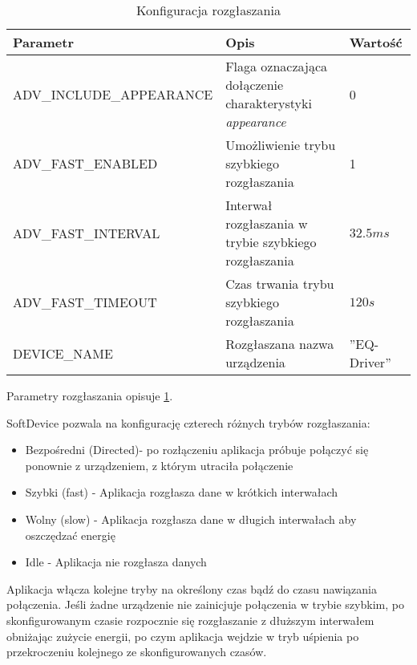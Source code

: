 \begin{table}[t]

\begin{tabularx}{\linewidth}{|l|X|l|}

\hline Parametr & Opis & Wartość \\

\hline ADV\_INCLUDE\_APPEARANCE & Flaga oznaczająca dołączenie charakterystyki
\emph{appearance} & 0 \\

\hline ADV\_FAST\_ENABLED & Umożliwienie trybu szybkiego rozgłaszania & 1 \\

\hline ADV\_FAST\_INTERVAL & Interwał rozgłaszania w trybie szybkiego
rozgłaszania & $32.5ms$ \\

\hline ADV\_FAST\_TIMEOUT & Czas trwania trybu szybkiego rozgłaszania & $120s$
\\

\hline DEVICE\_NAME & Rozgłaszana nazwa urządzenia & ''EQ-Driver'' \\

\hline \end{tabularx}

\caption{Konfiguracja rozgłaszania}

\label{tab:parametry-rozglaszania}

\end{table}

Parametry rozgłaszania opisuje \ref{tab:parametry-rozglaszania}.

SoftDevice pozwala na konfigurację czterech różnych trybów rozgłaszania:

\begin{itemize}

\item Bezpośredni (Directed)- po rozłączeniu aplikacja próbuje połączyć się
ponownie z urządzeniem, z którym utraciła połączenie

\item Szybki (fast) - Aplikacja rozgłasza dane w krótkich interwałach

\item Wolny (slow) - Aplikacja rozgłasza dane w długich interwałach aby
oszczędzać energię

\item Idle - Aplikacja nie rozgłasza danych

\end{itemize}

Aplikacja włącza kolejne tryby na określony czas bądź do czasu nawiązania
połączenia. Jeśli żadne urządzenie nie zainicjuje połączenia w trybie szybkim,
po skonfigurowanym czasie rozpocznie się rozgłaszanie z dłuższym interwałem
obniżając zużycie energii, po czym aplikacja wejdzie w tryb uśpienia po
przekroczeniu kolejnego ze skonfigurowanych czasów.

